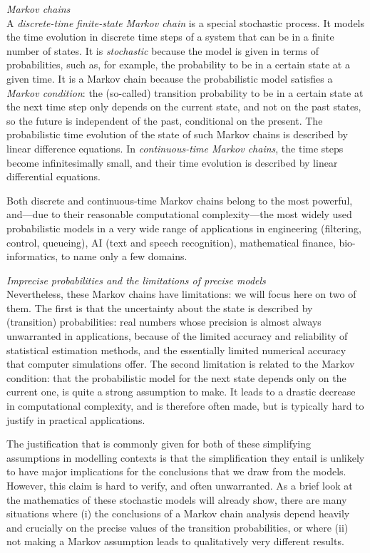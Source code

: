 \documentclass[11pt,dvipsnames,usenames,a4paper]{article}
\begin{document}
\vspace{5pt}
\emph{Markov chains}\\[5pt]
A \emph{discrete-time} \emph{finite-state} \emph{Markov chain} is a special stochastic process. 
It models the time evolution in discrete time steps of a system that can be in a finite number of states.
It is \emph{stochastic} because the model is given in terms of probabilities, such as, for example, the probability to be in a certain state at a given time.
It is a Markov chain because the probabilistic model satisfies a \emph{Markov condition}: the (so-called) transition probability to be in a certain state at the next time step only depends on the current state, and not on the past states, so the future is independent of the past, conditional on the present.
The probabilistic time evolution of the state of such Markov chains is described by linear difference equations.
In \emph{continuous-time Markov chains}, the time steps become infinitesimally small, and their time evolution is described by linear differential equations. 

Both discrete and continuous-time Markov chains belong to the most powerful, and---due to their reasonable computational complexity---the most widely used probabilistic models in a very wide range of applications in engineering (filtering, control, queueing), AI (text and speech recognition), mathematical finance, bio-informatics, to name only a few domains.

\vspace{5pt}
\emph{Imprecise probabilities and the limitations of precise models}\\[5pt]
Nevertheless, these Markov chains have limitations: we will focus here on two of them.
The first is that the uncertainty about the state is described by (transition) probabilities: real numbers whose precision is almost always unwarranted in applications, because of the limited accuracy and reliability of statistical estimation methods, and the essentially limited numerical accuracy that computer simulations offer.
The second limitation is related to the Markov condition: that the probabilistic model for the next state depends only on the current one, is quite a strong assumption to make. 
It leads to a drastic decrease in computational complexity, and is therefore often made, but is typically hard to justify in practical applications.

The justification that is commonly given for both of these simplifying assumptions in modelling contexts is that the simplification they entail is unlikely to have major implications for the conclusions that we draw from the models.
However, this claim is hard to verify, and often unwarranted.
As a brief look at the mathematics of these stochastic models will already show, there are many situations where (i) the conclusions of a Markov chain analysis depend heavily and crucially on the precise values of the transition probabilities, or where (ii) not making a Markov assumption leads to qualitatively very different results.
\end{document}
